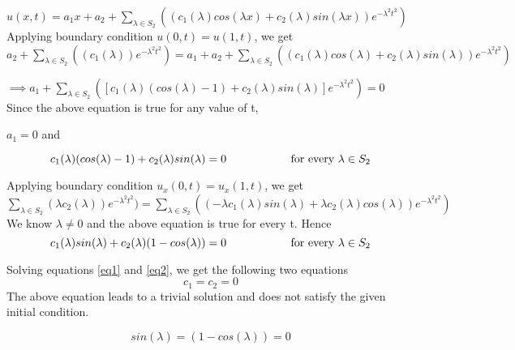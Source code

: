 \documentclass[12pt]{article}
\begin{document}
	$u(x,t) = a_1 x + a_2 + \sum_{\lambda \in S_2}^{}((c_1(\lambda)cos({\lambda x})+c_2(\lambda)sin({\lambda x}))e^{-\lambda^2 t^2})$ \\
	
	Applying boundary condition $u(0,t) = u(1,t)$, we get \\
	
	$a_2 + \sum_{\lambda \in S_2}^{}((c_1(\lambda))e^{-\lambda^2 t^2}) = a_1 + a_2 + \sum_{\lambda \in S_2}^{}((c_1(\lambda)cos({\lambda })+c_2(\lambda)sin({\lambda}))e^{-\lambda^2 t^2})$
	
	$\implies a_1 + \sum_{\lambda \in S_2}^{}([c_1(\lambda)(cos({\lambda })-1)+c_2(\lambda)sin({\lambda})]e^{-\lambda^2 t^2}) = 0$ \\ 
	
	Since the above equation is true for any value of t, 
	
	\begin{center}
		$a_1 = 0$ \hspace{30mm} and
	\end{center}	
	\begin{equation} \label{eq1}
	c_1(\lambda)(cos({\lambda })-1)+c_2(\lambda)sin({\lambda}) = 0 \hspace{20mm}  \text{for every $\lambda \in S_2$}
	\end{equation} 
	
	Applying boundary condition $u_x(0,t)=u_x(1,t)$, we get \\
	
	$\sum_{\lambda \in S_2}^{}(\lambda c_2(\lambda))e^{-\lambda^2 t^2})= \sum_{\lambda \in S_2}^{}((-\lambda c_1(\lambda)sin(\lambda)+\lambda c_2(\lambda)cos(\lambda))e^{-\lambda^2 t^2})$ \\
	
	We know $\lambda \neq 0$ and the above equation is true for every t. Hence 	
	\begin{equation} \label{eq2}
	c_1(\lambda)sin(\lambda) + c_2(\lambda)(1-cos(\lambda))=0 \hspace{20mm}  \text{for every $\lambda \in S_2$}
	\end{equation}
	
	Solving equations \ref{eq1} and \ref{eq2}, we get the following two equations
	\begin{equation}
	c_1=c_2=0
	\end{equation}
	 The above equation leads to a trivial solution and does not satisfy the given initial condition.
	 
	 \begin{equation}
	 sin(\lambda)=(1-cos(\lambda))=0
	 \end{equation}
	
\end{document}
